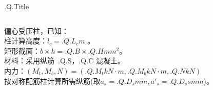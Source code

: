 

\begin{frame}[plain]{ {{.Q.Title}} }
\begin{columns}[onlytextwidth]
\begin{column}{0.75\textwidth}
偏心受压柱，已知：\\
柱计算高度：$l_c= {{.Q.L_c}} m$ 。 \\
矩形截面：$b \times h = {{.Q.B}} \times {{.Q.H}} mm^2$。\\
材料：采用纵筋~{{.Q.S}}，{{.Q.C}} 混凝土。\\
内力：$(M_t, M_b, N) = ( {{.Q.M_t}} kN\cdot m, {{.Q.M_b}} kN\cdot m, {{.Q.N}} kN)$ \\
按对称配筋柱计算所需纵筋(取$a_s = {{.Q.D_s}} mm, a'_s = {{.Q.D_ss}} mm$)。\\
\end{column}

\begin{column}{0.25\textwidth}
\begin{center}
\end{center}
\end{column}

\end{columns}
\end{frame}

